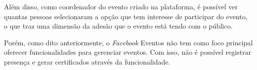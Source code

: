 Além disso, como coordenador do evento criado na plataforma, é possível ver quantas pessoas selecionaram a opção que tem interesse de participar do evento, o que traz uma dimensão da adesão que o evento está tendo com o público.

Porém, como dito anteriormente, o \textit{Facebook} Eventos não tem como foco principal oferecer funcionalidades para gerenciar eventos. Com isso, não é possível registrar presença e gerar certificados através da funcionalidade.